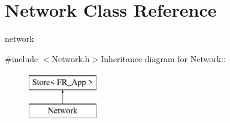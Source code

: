 \hypertarget{classNetwork}{
\section{Network Class Reference}
\label{classNetwork}
}


network  


{\ttfamily \#include $<$Network.h$>$}Inheritance diagram for Network::\begin{figure}[H]
\begin{center}
\leavevmode
\includegraphics[height=2cm]{classNetwork}
\end{center}
\end{figure}
